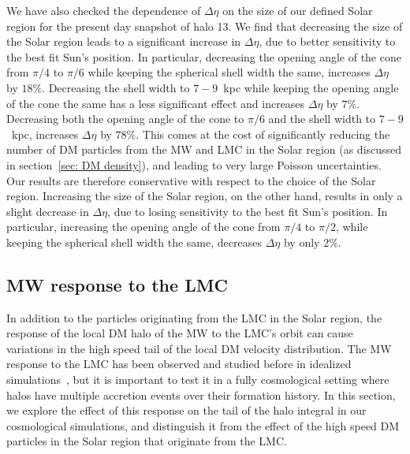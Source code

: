 We have also checked the dependence of $\Delta \eta$  on the size of our defined Solar region for the present day snapshot of halo 13. We find that decreasing the size of the Solar region leads to a significant increase in $\Delta \eta$, due to better sensitivity to the best fit Sun's position. In particular, decreasing the opening angle of the cone from $\pi/4$ to $\pi/6$ while keeping the spherical shell width the same, increases $\Delta \eta$ by $18\%$. Decreasing the shell width to $7-9$~kpc while keeping the opening angle of the cone the same has a less significant effect and increases $\Delta \eta$ by $7\%$. Decreasing both the opening angle of the cone to $\pi/6$ and the shell width to $7-9$~kpc, increases $\Delta \eta$ by $78\%$. This comes at the cost of significantly reducing the number of DM particles from the MW and LMC in the Solar region (as discussed in section~\ref{sec: DM density}), and leading to very large Poisson uncertainties. Our results are therefore conservative with respect to the choice of the Solar region. Increasing the size of the Solar region, on the other hand, results in only a slight decrease in $\Delta \eta$, due to losing sensitivity to the best fit Sun's position. In particular, increasing the opening angle of the cone from  $\pi/4$ to $\pi/2$, while keeping the spherical shell width the same, decreases $\Delta \eta$ by only $2\%$.  

\subsection{MW response to the LMC}
\label{sec: MW response}

In addition to the particles originating from the LMC in the Solar region, the response of the local DM halo of the MW to the LMC's orbit can cause variations in the high speed tail of the local DM velocity distribution. The MW response to the LMC has been observed and studied before in idealized simulations~\cite{Besla:2019xbx, Donaldson:2021byu}, but it is important to test it in a fully cosmological setting where halos have multiple accretion events over their formation history. In this section, we explore the effect of this response on the tail of the halo integral in our cosmological simulations, and distinguish it from the effect of the high speed DM particles in the Solar region that originate from the LMC.



